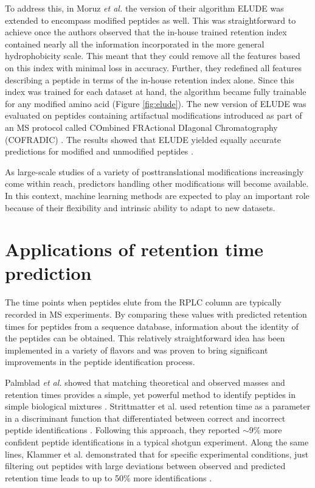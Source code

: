 \documentclass[a4paper]{article}
\begin{document}
To address this, in Moruz {\em et al.}\cite{elude2} the version of
their algorithm {\sc ELUDE} was extended to encompass modified
peptides as well. This was straightforward to achieve once the authors
observed that the in-house trained retention index contained nearly
all the information incorporated in the more general hydrophobicity
scale.  This meant that they could remove all the features based on
this index with minimal loss in accuracy. Further, they redefined all
features describing a peptide in terms of the in-house retention index
alone.  Since this index was trained for each dataset at hand, the
algorithm became fully trainable for any modified amino acid (Figure
\ref{fig:elude}). The new version of {\sc ELUDE} was evaluated on
peptides containing artifactual modifications introduced as part of an
MS protocol called COmbined FRActional DIagonal Chromatography
(COFRADIC) \cite{Gevaert2002}. The results showed that {\sc ELUDE}
yielded equally accurate predictions for modified and unmodified
peptides \cite{elude2}.

As large-scale studies of a variety of posttranslational modifications
increasingly come within reach, predictors
handling other modifications will become available. In this context,
machine learning methods are expected to play an important role
because of their flexibility and intrinsic ability to adapt to new
datasets.


\section{\label{sec:app}Applications of retention time prediction}

The time points when peptides elute from the RPLC column are typically
recorded in MS experiments. By comparing these values with predicted
retention times for peptides from a sequence database, information
about the identity of the peptides can be obtained. This relatively
straightforward idea has been implemented in a variety of flavors and
was proven to bring significant improvements in the peptide
identification process.


Palmblad {\em et al.} showed that matching theoretical and observed masses
and retention times provides a simple, yet powerful method to identify
peptides in simple biological
mixtures \cite{palmblad2002prediction}. Strittmatter et al. used
retention time as a parameter in a discriminant function that
differentiated between correct and incorrect peptide
identifications \cite{Strittmatter2004}. Following this approach, they
reported $\sim$9\% more confident peptide identifications in a typical
shotgun experiment. Along the same lines, Klammer et al. demonstrated
that for specific experimental conditions, just filtering out peptides
with large deviations between observed and predicted retention time
leads to up to 50\% more
identifications \cite{klammer2007improving}. 
\end{document}
